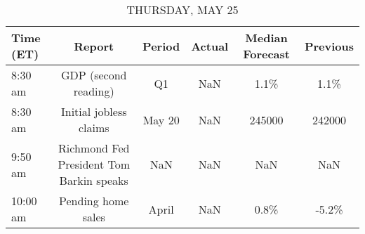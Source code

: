 \documentclass{article}%
\begin{document}
%


\begin{table}[htbp]%
\caption{THURSDAY, MAY 25}%
\centering%
\begin{adjustbox}{width=1\textwidth}%
\begin{tabular}{lccccc}
\toprule
Time (ET) &                                   Report & Period & Actual & Median Forecast & Previous \\
\midrule
  8:30 am &                     GDP (second reading) &     Q1 &    NaN &            1.1\% &     1.1\% \\
  8:30 am &                   Initial jobless claims & May 20 &    NaN &          245000 &   242000 \\
  9:50 am & Richmond Fed President Tom Barkin speaks &    NaN &    NaN &             NaN &      NaN \\
 10:00 am &                       Pending home sales &  April &    NaN &            0.8\% &    -5.2\% \\
\bottomrule
\end{tabular}
%
\end{adjustbox}%
\end{table}

%
\end{document}
